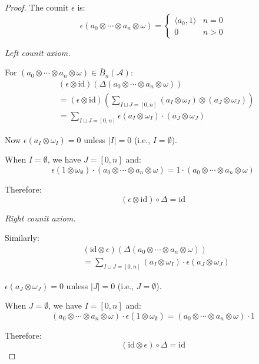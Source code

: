 \begin{proof}

The counit $\epsilon$ is:
\[\epsilon(a_0 \otimes \cdots \otimes a_n \otimes \omega) =
\begin{cases}
\langle a_0, 1 \rangle & n = 0 \\
0 & n > 0
\end{cases}\]

\smallskip\noindent\emph{Left counit axiom.}

For $(a_0 \otimes \cdots \otimes a_n \otimes \omega) \in \bar{B}_n(\mathcal{A})$:
\begin{align*}
&(\epsilon \otimes \text{id})(\Delta(a_0 \otimes \cdots \otimes a_n \otimes \omega)) \\
&= (\epsilon \otimes \text{id})\left(\sum_{I \sqcup J = [0,n]} (a_I \otimes \omega_I) \otimes (a_J \otimes \omega_J)\right) \\
&= \sum_{I \sqcup J = [0,n]} \epsilon(a_I \otimes \omega_I) \cdot (a_J \otimes \omega_J)
\end{align*}

Now $\epsilon(a_I \otimes \omega_I) = 0$ unless $|I| = 0$ (i.e., $I = \emptyset$).

When $I = \emptyset$, we have $J = [0,n]$ and:
\[\epsilon(1 \otimes \omega_{\emptyset}) \cdot (a_0 \otimes \cdots \otimes a_n \otimes \omega) = 1 \cdot (a_0 \otimes \cdots \otimes a_n \otimes \omega)\]

Therefore:
\[(\epsilon \otimes \text{id}) \circ \Delta = \text{id}\]

\smallskip\noindent\emph{Right counit axiom.}

Similarly:
\begin{align*}
&(\text{id} \otimes \epsilon)(\Delta(a_0 \otimes \cdots \otimes a_n \otimes \omega)) \\
&= \sum_{I \sqcup J = [0,n]} (a_I \otimes \omega_I) \cdot \epsilon(a_J \otimes \omega_J)
\end{align*}

$\epsilon(a_J \otimes \omega_J) = 0$ unless $|J| = 0$ (i.e., $J = \emptyset$).

When $J = \emptyset$, we have $I = [0,n]$ and:
\[(a_0 \otimes \cdots \otimes a_n \otimes \omega) \cdot \epsilon(1 \otimes \omega_{\emptyset}) = (a_0 \otimes \cdots \otimes a_n \otimes \omega) \cdot 1\]

Therefore:
\[(\text{id} \otimes \epsilon) \circ \Delta = \text{id}\]
\end{proof}

